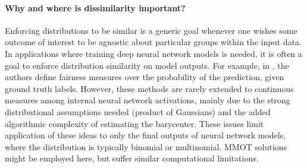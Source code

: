
\paragraph{Why and where is dissimilarity important?}
Enforcing distributions to be similar is a generic goal whenever one wishes some outcome of interest to be agnostic about particular groups within the input data.
In applications where training deep neural network models is needed,
it is often a goal to enforce distribution similarity on model outputs. 
For example, in \cite{jiang2020wasserstein}, the authors define fairness measures over the probability of the prediction, given ground truth labels.   
% 
However, these methods are rarely extended to continuous measures 
among internal neural network activations,
mainly due to the strong distributional assumptions needed (product of Gaussians) and the added algorithmic complexity of estimating the barycenter.
These issues limit application of these ideas 
to only the final outputs of neural network models, where the distribution is typically binomial or multinomial.
MMOT solutions might be employed here, but suffer similar computational limitations.

